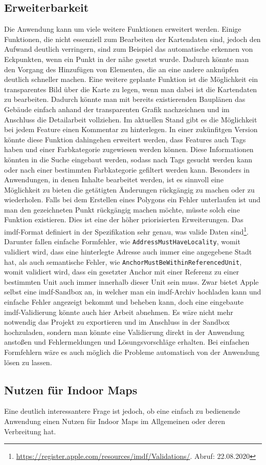 \subsection{Erweiterbarkeit}
Die Anwendung kann um viele weitere Funktionen erweitert werden.
Einige Funktionen, die nicht essenziell zum Bearbeiten der Kartendaten sind, jedoch den Aufwand deutlich verringern, sind zum Beispiel das automatische erkennen von Eckpunkten, wenn ein Punkt in der nähe gesetzt wurde.
Dadurch könnte man den Vorgang des Hinzufügen von Elementen, die an eine andere anknüpfen deutlich schneller machen.\pbreak
%
Eine weitere geplante Funktion ist die Möglichkeit ein transparentes Bild über die Karte zu legen, wenn man dabei ist die Kartendaten zu bearbeiten.
Dadurch könnte man mit bereits existierenden Bauplänen das Gebäude einfach anhand der transparenten Grafik nachzeichnen und im Anschluss die Detailarbeit vollziehen.\pbreak%
%
Im aktuellen Stand gibt es die Möglichkeit bei jedem Feature einen Kommentar zu hinterlegen.
In einer zukünfitgen Version könnte diese Funktion dahingehen erweitert werden, dass Features auch Tags haben und einer Farbkategorie zugewiesen werden können.
Diese Informationen könnten in die Suche eingebaut werden, sodass nach Tags gesucht werden kann oder nach einer bestimmten Farbkategorie gefiltert werden kann.\pbreak%
%
Besonders in Anwendungen, in denen Inhalte bearbeitet werden, ist es sinnvoll eine Möglichkeit zu bieten die getätigten Änderungen rückgängig zu machen oder zu wiederholen.
Falls bei dem Erstellen eines Polygons ein Fehler unterlaufen ist und man den gezeichneten Punkt rückgängig machen möchte, müsste solch eine Funktion existieren.
Dies ist eine der höher priorisierten Erweiterungen.\pbreak%
%
Das \ac{imdf}-Format definiert in der Spezifikation sehr genau, was valide Daten sind\footnote{\url{https://register.apple.com/resources/imdf/Validations/}. Abruf: 22.08.2020}.
Darunter fallen einfache Formfehler, wie \texttt{AddressMustHaveLocality}, womit validiert wird, dass eine hinterlegte Adresse auch immer eine angegebene Stadt hat, als auch semantische Fehler, wie \texttt{AnchorMustBeWithinReferencedUnit}, womit validiert wird, dass ein gesetzter Anchor mit einer Referenz zu einer bestimmten Unit auch immer innerhalb dieser Unit sein muss.
Zwar bietet Apple selbst eine \ac{imdf}-Sandbox an, in welcher man ein \ac{imdf}-Archiv hochladen kann und einfache Fehler angezeigt bekommt und beheben kann, doch eine eingebaute \ac{imdf}-Validierung könnte auch hier Arbeit abnehmen.
Es wäre nicht mehr notwendig das Projekt zu exportieren und im Anschluss in der Sandbox hochzuladen, sondern man könnte eine Validierung direkt in der Anwendung anstoßen und Fehlermeldungen und Lösungsvorschläge erhalten.
Bei einfachen Formfehlern wäre es auch möglich die Probleme automatisch von der Anwendung lösen zu lassen.

\subsection{Nutzen für Indoor Maps}
Eine deutlich interessantere Frage ist jedoch, ob eine einfach zu bedienende Anwendung einen Nutzen für Indoor Maps im Allgemeinen oder deren Verbreitung hat.
